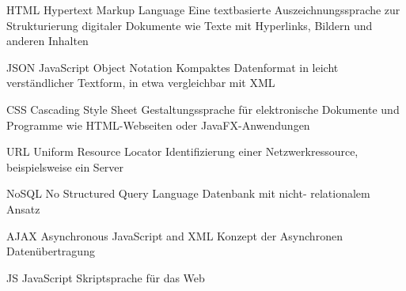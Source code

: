   {HTML}            %
  {Hypertext Markup Language}  %
  {Eine textbasierte Auszeichnungssprache zur Strukturierung digitaler Dokumente wie Texte mit Hyperlinks, Bildern und anderen Inhalten } %
 
  
  {JSON}            %
  { JavaScript Object Notation}  %
  {Kompaktes Datenformat in leicht verständlicher Textform, in etwa vergleichbar mit XML } %

  {CSS}            %
  { Cascading Style Sheet}  %
  {Gestaltungssprache für elektronische Dokumente und Programme wie HTML-Webseiten oder JavaFX-Anwendungen } %


  {URL}            %
  { Uniform Resource Locator}  %
  {Identifizierung einer Netzwerkressource, beispielsweise ein Server } %
    
  
  {NoSQL}            %
  { No Structured Query Language}  %
  {Datenbank mit nicht- relationalem Ansatz } %
  
{AJAX}            %
{Asynchronous JavaScript and XML}  %
{Konzept der Asynchronen Datenübertragung } %

{JS}            %
{JavaScript}  %
{Skriptsprache für das Web } %





